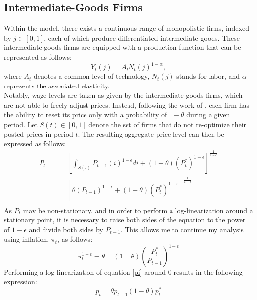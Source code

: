 \documentclass[11pt, a4paper, leqno]{article}
\begin{document}
\subsection{Intermediate-Goods Firms}
Within the model, there exists a continuous range of monopolistic firms, indexed by $j \in [0,1]$, each of which produce differentiated intermediate goods. These intermediate-goods firms are equipped with a production function that can be represented as follows:
\begin{equation}
		Y_{t}(j) = A_{t}N_{t}(j)^{1- \alpha},
\end{equation}
where $A_{t}$ denotes a common level of technology, $N_{t}(j)$ stands for labor, and $\alpha$ represents the associated elasticity.\\
Notably, wage levels are taken as given by the intermediate-goods firms, which are not able to freely adjust prices. Instead, following the work of \citet{calvo1983staggered}, each firm has the ability to reset its price only with a probability of $1- \theta$ during a given period. Let $S(t) \in [0,1]$ denote the set of firms that do not re-optimize their posted prices in period $t$. The resulting aggregate price level can then be expressed as follows:
\begin{equation}
	\begin{aligned}
	P_{t} \quad & = \left[ \int_{S(t)}^{} P_{t-1}(i)^{1- \epsilon} di + (1- \theta) \left( P^{*}_{t} \right)^{1- \epsilon} \right]^{\frac{1}{1- \epsilon}}\\
		\quad & = \left[ \theta \left( P_{t-1} \right)^{1- \epsilon} + \left(1- \theta \right) \left( P^{*}_{t} \right)^{1- \epsilon} \right]^{\frac{1}{1- \epsilon}}\\
	\end{aligned}
\end{equation}
As $P_{t}$ may be non-stationary, and in order to perform a log-linearization around a stationary point, it is necessary to raise both sides of the equation to the power of $1- \epsilon$ and divide both sides by $P_{t-1}$. This allows me to continue my analysis using inflation, $\pi_{t}$, as follows:
\begin{equation} \label{pi}
	\pi_{t}^{1- \epsilon} = \theta + (1- \theta) \left( \frac{P^{*}_{t}}{P_{t-1}} \right)^{1- \epsilon}
\end{equation}
Performing a log-linearization of equation \ref{pi} around $0$ results in the following expression:
\begin{equation}
	p_{t} = \theta p_{t-1} \left( 1- \theta \right) p^{*}_{t}
\end{equation}
\end{document}
